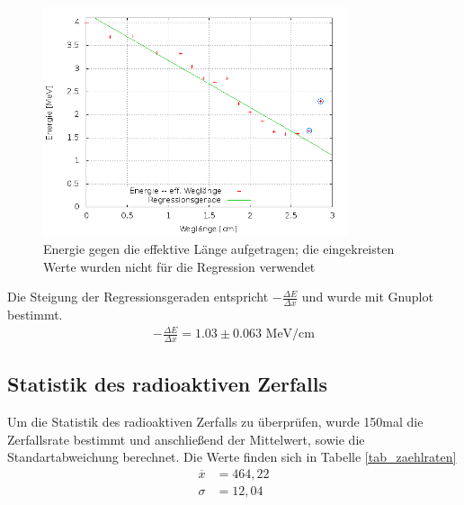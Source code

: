 \begin{figure}[H]
\includegraphics[width=0.8\textwidth]{pics/energie_weglaenge.png}
\caption{Energie gegen die effektive Länge aufgetragen; die eingekreisten Werte wurden nicht für die Regression verwendet}
\end{figure}
Die Steigung der Regressionsgeraden entspricht $-\frac{\Delta E}{\Delta x}$ und wurde mit Gnuplot bestimmt.
\begin{align*}
-\frac{\Delta E}{\Delta x} = 1.03   \pm 0.063 \text{ MeV/cm}
\end{align*}
\subsection{Statistik des radioaktiven Zerfalls}
Um die Statistik des radioaktiven Zerfalls zu überprüfen, wurde 150mal die Zerfallsrate bestimmt und anschließend der Mittelwert, sowie die Standartabweichung berechnet. Die Werte finden sich in Tabelle \ref{tab_zaehlraten}\\
\begin{align*}
\overline{x}&=464,22\\
\sigma&=12,04
\end{align*}

